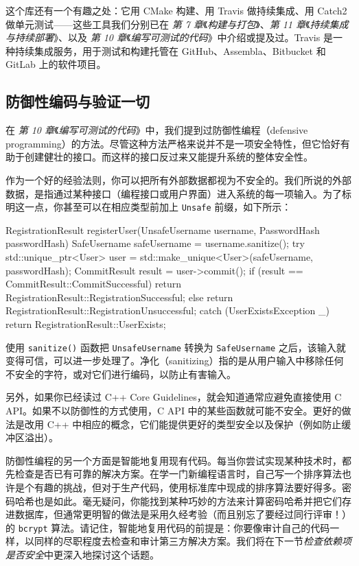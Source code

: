 这个库还有一个有趣之处：它用 CMake 构建、用 Travis 做持续集成、用 Catch2 做单元测试——这些工具我们分别已在 \emph{第 7 章}《\emph{构建与打包}》、\emph{第 11 章}《\emph{持续集成与持续部署}》、以及 \emph{第 10 章}《\emph{编写可测试的代码}》中介绍或提及过。Travis 是一种持续集成服务，用于测试和构建托管在 GitHub、Assembla、Bitbucket 和 GitLab 上的软件项目。

\subsection{防御性编码与验证一切}

\label{idx:1030}
在 \emph{第 10 章}《\emph{编写可测试的代码}》中，我们提到过防御性编程（defensive programming）的方法。尽管这种方法严格来说并不是一项安全特性，但它恰好有助于创建健壮的接口。而这样的接口反过来又能提升系统的整体安全性。

作为一个好的经验法则，你可以把所有外部数据都视为不安全的。我们所说的外部数据，是指通过某种接口（编程接口或用户界面）进入系统的每一项输入。为了标明这一点，你甚至可以在相应类型前加上 \texttt{Unsafe} 前缀，如下所示：

\begin{codebox}[cpp]
RegistrationResult registerUser(UnsafeUsername username, PasswordHash passwordHash)
{
  SafeUsername safeUsername = username.sanitize();
  try
  {
    std::unique_ptr<User> user = std::make_unique<User>(safeUsername, passwordHash);
    CommitResult result = user->commit();
    if (result == CommitResult::CommitSuccessful)
    {
      return RegistrationResult::RegistrationSuccessful;
    }
    else
    {
      return RegistrationResult::RegistrationUnsuccessful;
    }
  }
  catch (UserExistsException _)
  {
    return RegistrationResult::UserExists;
  }
}
\end{codebox}

使用 \texttt{sanitize(\allowbreak{})\allowbreak{}} 函数把 \texttt{Unsafe\allowbreak{}Username} 转换为 \texttt{Safe\allowbreak{}Username} 之后，该输入就变得可信，可以进一步处理了。净化（sanitizing）指的是从用户输入中移除任何不安全的字符，或对它们进行编码，以防止有害输入。

另外，如果你已经读过 C++ Core Guidelines，就会知道通常应避免直接使用 C API。如果不以防御性的方式使用，C API 中的某些函数就可能不安全。更好的做法是改用 C++ 中相应的概念，它们能提供更好的类型安全以及保护（例如防止缓冲区溢出）。

\label{idx:1031}
防御性编程的另一个方面是智能地复用现有代码。每当你尝试实现某种技术时，都先检查是否已有可靠的解决方案。在学一门新编程语言时，自己写一个排序算法也许是个有趣的挑战，但对于生产代码，使用标准库中现成的排序算法要好得多。密码哈希也是如此。毫无疑问，你能找到某种巧妙的方法来计算密码哈希并把它们存进数据库，但通常更明智的做法是采用久经考验（而且别忘了要经过同行评审！）的 \texttt{bcrypt} 算法。请记住，智能地复用代码的前提是：你要像审计自己的代码一样，以同样的尽职程度去检查和审计第三方解决方案。我们将在下一节\emph{检查依赖项是否安全}中更深入地探讨这个话题。

